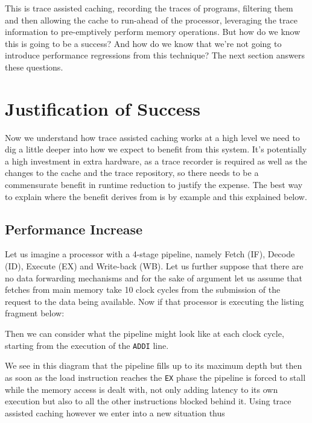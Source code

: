 This is trace assisted caching, recording the traces of programs, filtering them and then allowing the cache to run-ahead of the processor, leveraging the trace information to pre-emptively perform memory operations. But how do we know this is going to be a success? And how do we know that we're not going to introduce performance regressions from this technique? The next section answers these questions.

\section{Justification of Success}

Now we understand how trace assisted caching works at a high level we need to dig a little deeper into how we expect to benefit from this system. It's potentially a high investment in extra hardware, as a trace recorder is required as well as the changes to the cache and the trace repository, so there needs to be a commensurate benefit in runtime reduction to justify the expense. The best way to explain where the benefit derives from is by example and this explained below.

\subsection{Performance Increase}

Let us imagine a processor with a 4-stage pipeline, namely Fetch (IF), Decode (ID), Execute (EX) and Write-back (WB). Let us further suppose that there are no data forwarding mechanisms and for the sake of argument let us assume that fetches from main memory take 10 clock cycles from the submission of the request to the data being available. Now if that processor is executing the listing fragment below:



Then we can consider what the pipeline might look like at each clock cycle, starting from the execution of the \texttt{ADDI} line.


We see in this diagram that the pipeline fills up to its maximum depth but then as soon as the load instruction reaches the \texttt{EX} phase the pipeline is forced to stall while the memory access is dealt with, not only adding latency to its own execution but also to all the other instructions blocked behind it. Using trace assisted caching however we enter into a new situation thus

